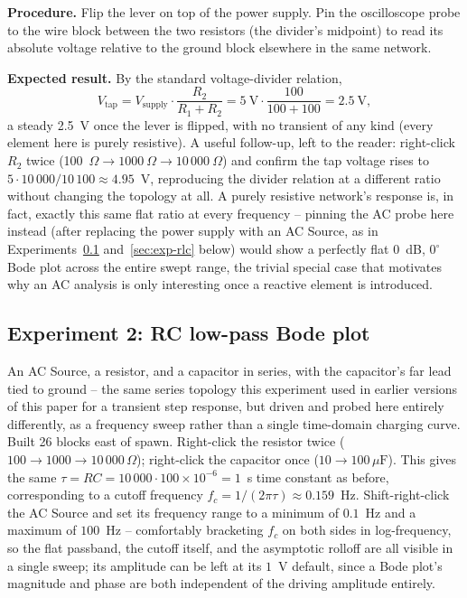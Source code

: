 \textbf{Procedure.} Flip the lever on top of the power supply. Pin the oscilloscope probe to
the wire block between the two resistors (the divider's midpoint) to read its absolute
voltage relative to the ground block elsewhere in the same network.

\textbf{Expected result.} By the standard voltage-divider relation,
\begin{equation}
V_{\text{tap}} = V_{\text{supply}} \cdot \frac{R_2}{R_1 + R_2} = 5~\text{V} \cdot \frac{100}{100+100} = 2.5~\text{V},
\end{equation}
a steady 2.5~V once the lever is flipped, with no transient of any kind (every element here
is purely resistive). A useful follow-up, left to the reader: right-click $R_2$ twice
(100~$\Omega \to 1000~\Omega \to 10\,000~\Omega$) and confirm the tap voltage rises to
$5 \cdot 10\,000/10\,100 \approx 4.95$~V, reproducing the divider relation at a different
ratio without changing the topology at all. A purely resistive network's response is, in
fact, exactly this same flat ratio at every frequency -- pinning the AC probe here instead
(after replacing the power supply with an AC Source, as in Experiments~\ref{sec:exp-rc}
and~\ref{sec:exp-rlc} below) would show a perfectly flat 0~dB, $0^\circ$ Bode plot across the
entire swept range, the trivial special case that motivates why an AC analysis is only
interesting once a reactive element is introduced.

\subsection{Experiment 2: RC low-pass Bode plot}
\label{sec:exp-rc}

An AC Source, a resistor, and a capacitor in series, with the capacitor's far lead tied to
ground -- the same series topology this experiment used in earlier versions of this paper for
a transient step response, but driven and probed here entirely differently, as a frequency
sweep rather than a single time-domain charging curve. Built 26 blocks east of spawn.
Right-click the resistor twice ($100 \to 1000 \to 10\,000\,\Omega$); right-click the
capacitor once ($10 \to 100\,\mu\text{F}$). This gives the same
$\tau = RC = 10\,000 \cdot 100\times10^{-6} = 1$~s time constant as before, corresponding to a
cutoff frequency $f_c = 1/(2\pi\tau) \approx 0.159$~Hz. Shift-right-click the AC Source and
set its frequency range to a minimum of $0.1$~Hz and a maximum of $100$~Hz -- comfortably
bracketing $f_c$ on both sides in log-frequency, so the flat passband, the cutoff itself, and
the asymptotic rolloff are all visible in a single sweep; its amplitude can be left at its
$1$~V default, since a Bode plot's magnitude and phase are both independent of the driving
amplitude entirely.

